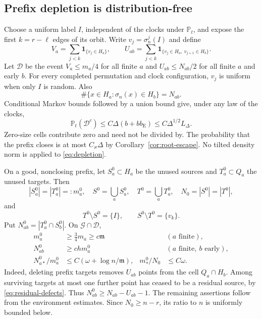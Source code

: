 \documentclass[11pt]{article}
\numberwithin{equation}{section}
\theoremstyle{definition}
\theoremstyle{remark}
\newcommand{\Pp}{\mathbb P}
\newcommand{\one}{\mathbf 1}
\newcommand{\cG}{\mathcal G}
\newcommand{\mres}{\mathfrak m}
\begin{document}
\subsection{Prefix depletion is distribution-free}
Choose a uniform label $I$, independent of the clocks under $\Pp_t$, and expose the first $k=r-\ell$ edges of its orbit. Write $v_j=\sigma_n^j(I)$ and define
\[
 V_a=\sum_{j<k}\one_{\{v_j\in H_a\}},\qquad
 U_{ab}=\sum_{j<k}\one_{\{v_j\in H_a,\ v_{j+1}\in H_b\}}.
\]
Let $\mathcal D$ be the event $V_a\le m_a/4$ for all finite $a$ and $U_{ab}\le N_{ab}/2$ for all finite $a$ and early $b$.
For every completed permutation and clock configuration, $v_j$ is uniform when only $I$ is random. Also
\[
 \#\{x\in H_a:\sigma_n(x)\in H_b\}=N_{ab}.
\]
Conditional Markov bounds followed by a union bound give, under any law of the clocks,
\begin{equation}\label{eq:depletion}
 \Pp_t(\mathcal D^c)\le C\Delta(b+bb_{\mathrm E})
 \le C\Delta^{1/2}L_\Delta.
\end{equation}
Zero-size cells contribute zero and need not be divided by. The probability that the prefix closes is at most $C_\varkappa\Delta$ by Corollary~\ref{cor:root-escape}. No tilted density norm is applied to \eqref{eq:depletion}.

On a good, nonclosing prefix, let $S_a^0\subset H_a$ be the unused sources and $T_a^0\subset Q_a$ the unused targets. Then
\[
 |S_a^0|=|T_a^0|=:m_a^0,\quad
 S^0=\bigcup_aS_a^0,\quad T^0=\bigcup_aT_a^0,\quad N_0=|S^0|=|T^0|,
\]
and
\begin{equation}\label{eq:residual-defects}
 T^0\setminus S^0=\{I\},\qquad S^0\setminus T^0=\{v_k\}.
\end{equation}
Put $N_{ab}^0=|T_a^0\cap S_b^0|$. On $\cG\cap\mathcal D$,
\begin{align}
 m_a^0&\ge\tfrac34m_a\ge c\mres &&(a\text{ finite}),\label{eq:residual-size}\\
 N_{ab}^0&\ge chm_a^0 &&(a\text{ finite},\ b\text{ early}),\label{eq:residual-early}\\
 N_{a*}^0/m_a^0&\le C(\omega+\log n/\mres),
 & m_*^0/N_0&\le C\omega .\label{eq:residual-tail}
\end{align}
Indeed, deleting prefix targets removes $U_{ab}$ points from the cell $Q_a\cap H_b$. Among surviving targets at most one further point has ceased to be a residual source, by \eqref{eq:residual-defects}. Thus $N_{ab}^0\ge N_{ab}-U_{ab}-1$. The remaining assertions follow from the environment estimates. Since $N_0\ge n-r$, its ratio to $n$ is uniformly bounded below.
\end{document}

